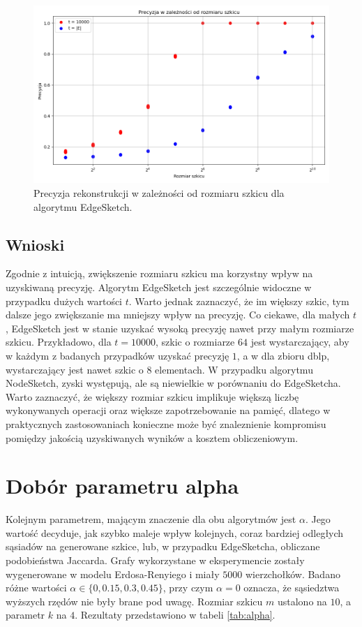     \begin{figure}[!ht]
        \includegraphics[width=16cm]{img/precision_m.png}
        \centering
        \caption[Precyzja rekonstrukcji]{Precyzja rekonstrukcji w zależności od rozmiaru szkicu dla algorytmu EdgeSketch.}
        \label{fig:precision_m}
    \end{figure}
    
    \subsection{Wnioski}
    Zgodnie z intuicją, zwiększenie rozmiaru szkicu ma korzystny wpływ na uzyskiwaną precyzję. Algorytm EdgeSketch jest szczególnie widoczne w przypadku dużych wartości $t$. Warto jednak zaznaczyć, że im większy szkic, tym dalsze jego zwiększanie ma mniejszy wpływ na precyzję. Co ciekawe, dla małych $t$, EdgeSketch jest w stanie uzyskać wysoką precyzję nawet przy małym rozmiarze szkicu. Przykładowo, dla $t = 10000$, szkic o rozmiarze $64$ jest wystarczający, aby w każdym z badanych przypadków uzyskać precyzję $1$, a w dla zbioru dblp, wystarczający jest nawet szkic o $8$ elementach. W przypadku algorytmu NodeSketch, zyski występują, ale są niewielkie w porównaniu do EdgeSketcha. Warto zaznaczyć, że większy rozmiar szkicu implikuje większą liczbę wykonywanych operacji oraz większe zapotrzebowanie na pamięć, dlatego w praktycznych zastosowaniach konieczne może być znaleznienie kompromisu pomiędzy jakością uzyskiwanych wyników a kosztem obliczeniowym.

\section{Dobór parametru alpha}

    Kolejnym parametrem, mającym znaczenie dla obu algorytmów jest $\alpha$. Jego wartość decyduje, jak szybko maleje wpływ kolejnych, coraz bardziej odległych sąsiadów na generowane szkice, lub, w przypadku EdgeSketcha, obliczane podobieństwa Jaccarda. Grafy wykorzystane w eksperymencie zostały wygenerowane w modelu Erdosa-Renyiego i miały $5000$ wierzchołków. Badano różne wartości $\alpha \in \{0, 0.15, 0.3, 0.45\}$, przy czym $\alpha = 0$ oznacza, że sąsiedztwa wyższych rzędów nie były brane pod uwagę. Rozmiar szkicu $m$ ustalono na $10$, a parametr $k$ na $4$. Rezultaty przedstawiono w tabeli \ref{tab:alpha}.

